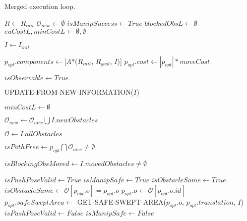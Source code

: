 \begin{algorithm}[H]

  \caption{Merged execution loop.}

  \label{alg:07-custom-merge-makeandexecuteplan-part1}

  \begin{algorithmic}[1]


      \State $R \gets R_{init}$
      \State $\mathcal{O}_{new} \gets \emptyset$
      \State $isManipSuccess \gets True$
      \State $blockedObsL \gets \emptyset$
      \State $euCostL, minCostL \gets \emptyset, \emptyset$

      \State $I \gets I_{init}$

      \State $p_{opt}.components \gets [$$A$*($R_{init}$, $R_{goal}$, $I$)]
      \State $p_{opt}.cost \gets |p_{opt}| * moveCost$

      \State $isObservable \gets True$


        \State UPDATE-FROM-NEW-INFORMATION($I$)

          \State $minCostL \gets \emptyset$
        \EndIf

        \State $\mathcal{O}_{new} \gets \mathcal{O}_{new} \bigcup I.newObstacles$

        \State $\mathcal{O} \gets I.allObstacles$

        \State $isPathFree \gets p_{opt} \bigcap \mathcal{O}_{new} \neq \emptyset$

        \State $isBlockingObsMoved \gets I.movedObstacles \neq \emptyset$

        \State $isPushPoseValid \gets True$
        \State $isManipSafe \gets True$
        \State $isObstacleSame \gets True$
          \State $isObstacleSame \gets \mathcal{O}[p_{opt}.o] = p_{opt}.o$
            \State $p_{opt}.o \gets \mathcal{O}[p_{opt}.o.id]$
            \State $p_{opt}.safeSweptArea \gets$ GET-SAFE-SWEPT-AREA($p_{opt}.o$, $p_{opt}.translation$, $I$)
              \State $isPushPoseValid \gets False$
            \EndIf
          \EndIf
            \State $isManipSafe \gets False$
          \EndIf
        \EndIf


\end{algorithmic}
\end{algorithm}
